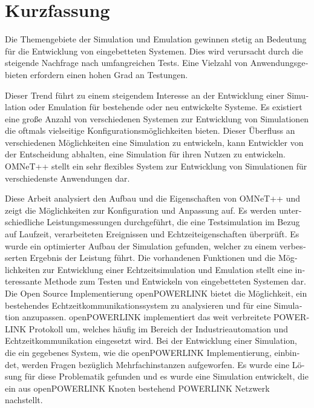 
\chapter{Kurzfassung}
\begin{german}
Die Themengebiete der Simulation und Emulation gewinnen stetig an Bedeutung für die Entwicklung von eingebetteten Systemen.
Dies wird verursacht durch die steigende Nachfrage nach umfangreichen Tests.
Eine Vielzahl von Anwendungsgebieten erfordern einen hohen Grad an Testungen.

Dieser Trend führt zu einem steigendem Interesse an der Entwicklung einer Simulation oder Emulation für bestehende oder neu entwickelte Systeme.
Es existiert eine große Anzahl von verschiedenen Systemen zur Entwicklung von Simulationen die oftmals vielseitige Konfigurationsmöglichkeiten bieten.
Dieser Überfluss an verschiedenen Möglichkeiten eine Simulation zu entwickeln, kann Entwickler von der Entscheidung abhalten, eine Simulation für ihren Nutzen zu entwickeln.
OMNeT++ stellt ein sehr flexibles System zur Entwicklung von Simulationen für verschiedenste Anwendungen dar.

\begin{sloppypar}
Diese Arbeit analysiert den Aufbau und die Eigenschaften von OMNeT++ und zeigt die Möglichkeiten zur Konfiguration und Anpassung auf.
Es werden unterschiedliche Leistungsmessungen durchgeführt, die eine Testsimulation im Bezug auf Laufzeit, verarbeiteten Ereignissen und Echtzeiteigenschaften überprüft.
Es wurde ein optimierter Aufbau der Simulation gefunden, welcher zu einem verbesserten Ergebnis der Leistung führt.
Die vorhandenen Funktionen und die Möglichkeiten zur Entwicklung einer Echtzeitsimulation und Emulation stellt eine interessante Methode zum Testen und Entwickeln von eingebetteten Systemen dar.
Die Open Source Implementierung openPOWERLINK bietet die Möglichkeit, ein bestehendes Echtzeitkommunikationssystem zu analysieren und für eine Simulation anzupassen.
openPOWERLINK implementiert das weit verbreitete POWERLINK Protokoll um, welches häufig im Bereich der Industrieautomation und Echtzeitkommunikation eingesetzt wird.
Bei der Entwicklung einer Simulation, die ein gegebenes System, wie die openPOWERLINK Implementierung, einbindet, werden Fragen bezüglich Mehrfachinstanzen aufgeworfen.
Es wurde eine Lösung für diese Problematik gefunden und es wurde eine Simulation entwickelt, die ein aus openPOWERLINK Knoten bestehend POWERLINK Netzwerk nachstellt.
\end{sloppypar}
    
\end{german}
